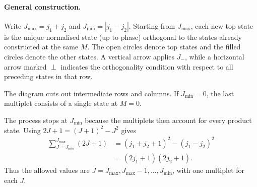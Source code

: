 \documentclass[11pt,a4paper]{article}
\begin{document}
\paragraph{General construction.}
Write $J_{\max}=j_1+j_2$ and $J_{\min}=|j_1-j_2|$. Starting from
$J_{\max}$, each new top state is the unique normalised state
(up to phase) orthogonal to the states already constructed at the
same $M$. The open circles denote top states and the filled circles
denote the other states. A vertical arrow applies $J_-$, while a
horizontal arrow marked $\perp$ indicates the orthogonality condition
with respect to all preceding states in that row.

\begin{center}
\end{center}
The diagram cuts out intermediate rows and columns. If $J_{\min}=0$,
the last multiplet consists of a single state at $M=0$.

The process stops at $J_{\min}$ because the multiplets then account
for every product state. Using $2J+1=(J+1)^2-J^2$ gives
\begin{align*}
    \sum_{J=J_{\min}}^{J_{\max}}(2J+1)
    &=(j_1+j_2+1)^2-(j_1-j_2)^2\\
    &=(2j_1+1)(2j_2+1).
\end{align*}
Thus the allowed values are $J=J_{\max},J_{\max}-1,\ldots,J_{\min}$,
with one multiplet for each $J$.
\end{document}
